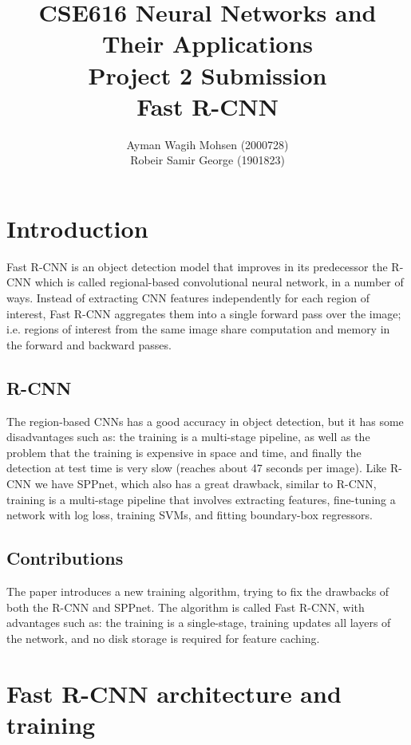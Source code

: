 \documentclass[10pt]{article}
\begin{document}
\title{CSE616 Neural Networks and Their Applications\\
Project 2 Submission\\
Fast R-CNN}
\author{Ayman Wagih Mohsen (2000728)\\Robeir Samir George (1901823)}
\maketitle

\section{Introduction}

Fast R-CNN is an object detection model that improves in its predecessor the R-CNN which is called regional-based convolutional neural network, in a number of ways. Instead of extracting CNN features independently for each region of interest, Fast R-CNN aggregates them into a single forward pass over the image; i.e. regions of interest from the same image share computation and memory in the forward and backward passes.

\subsection{R-CNN}
The region-based CNNs has a good accuracy in object detection, but it has some disadvantages such as: the training is a multi-stage pipeline, as well as the problem that the training is expensive in space and time, and finally the detection at test time is very slow (reaches about 47 seconds per image).
Like R-CNN we have SPPnet, which also has a great drawback, similar to R-CNN, training is a multi-stage pipeline that involves extracting features, fine-tuning a network with log loss, training SVMs, and fitting boundary-box regressors.

\subsection{Contributions}
The paper introduces a new training algorithm, trying to fix the drawbacks of both the R-CNN and SPPnet. 
The algorithm is called Fast R-CNN, with advantages such as: the training is a single-stage, training updates all layers of the network, and no disk storage is required for feature caching.


\section{Fast R-CNN architecture and training}
\end{document}
